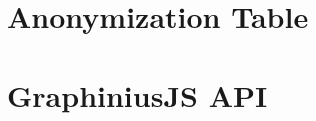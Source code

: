 
% 

\chapter{Anonymization Table}
\label{App:AppendixA}
{
}

\chapter{GraphiniusJS API}
\label{App:AppendixB}

\begin{landscape}
\end{landscape}
